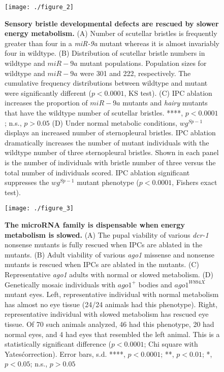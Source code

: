 \begin{figure}[h!]
\label{fig:metabolism:fig2}
\centering
\texttt{[image: ./figure\_2]}
\caption[Sensory bristle developmental defects are rescued by slower energy metabolism.]{\textbf{Sensory bristle developmental defects are rescued by slower energy metabolism.} (A) Number of scutellar bristles is frequently greater than four in a \textit{miR-9a} mutant whereas it is almost invariably four in wildtype. (B) Distribution of scutellar bristle numbers in wildtype and $miR-9a$ mutant populations. Population sizes for wildtype and $miR-9a$ were 301 and 222, respectively. The cumulative frequency distributions between wildtype and mutant were significantly different ($p<0.0001$, KS test). (C) IPC ablation increases the proportion of $miR-9a$ mutants and \textit{hairy} mutants that have the wildtype number of scutellar bristles. ****, $p<0.0001$; n.s., $p>0.05$ (D) Under normal metabolic conditions, $wg^{Sp-1}$ displays an increased number of sternopleural bristles. IPC ablation dramatically increases the number of mutant individuals with the wildtype number of three sternopleural bristles. Shown in each panel is the number of individuals with bristle number of three versus the total number of individuals scored. IPC ablation significant suppresses the $wg^{Sp-1}$ mutant phenotype ($p<0.0001$, Fishers exact test).}
\end{figure}

\begin{figure}[h!]
\label{fig:metabolism:fig3}
\centering
\texttt{[image: ./figure\_3]}
\caption[The microRNA family is dispensable when energy metabolism is slowed.]{\textbf{The microRNA family is dispensable when energy metabolism is slowed.} (A) The pupal viability of various \textit{dcr-1} nonsense mutants is fully rescued when IPCs are ablated in the mutants. (B) Adult viability of various \textit{ago1} missense and nonsense mutants is rescued when IPCs are ablated in the mutants. (C) Representative \textit{ago1} adults with normal or slowed metabolism. (D) Genetically mosaic individuals with $ago1^+$ bodies and $ago1^{W894X}$ mutant eyes. Left, representative individual with normal metabolism has almost no eye tissue (24/24 animals had this phenotype). Right, representative individual with slowed metabolism has rescued eye tissue. Of 70 such animals analyzed, 46 had this phenotype, 20 had normal eyes, and 4 had eyes that resembled the left animal. This is a statistically significant difference ($p<0.0001$; Chi square with Yates\' correction). Error bars, s.d. ****, $p<0.0001$; **, $p<0.01$; *, $p<0.05$; n.s., $p>0.05$}
\end{figure}

